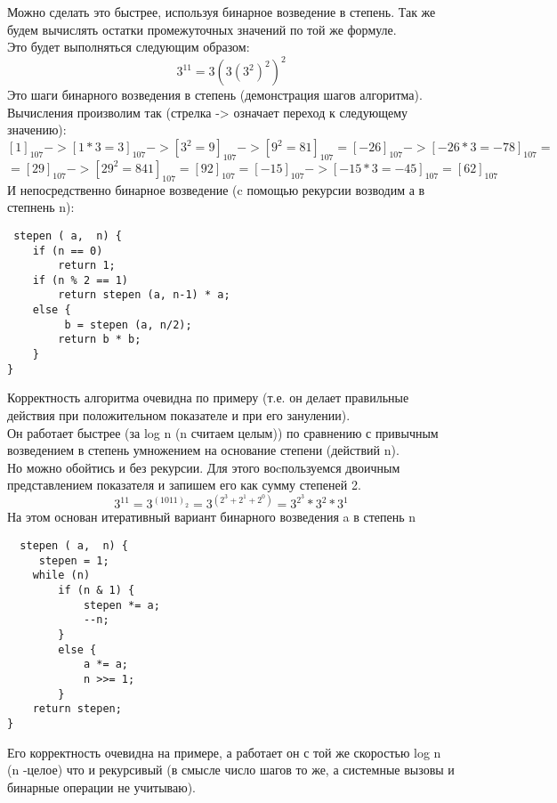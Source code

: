 \documentclass[a4paper,12pt]{article} %
\begin{document}
Можно сделать это быстрее, используя бинарное возведение в степень. Так же будем вычислять остатки  промежуточных значений по той же формуле.\\
Это будет выполняться следующим образом:\\
\[3^{11}=3\left(3\left(3^{2}\right)^{2}\right)^{2}\]
Это шаги бинарного возведения в степень (демонстрация шагов алгоритма).\\ Вычисления произволим так (стрелка -> означает переход к следующему значению):\\
\[[1]_{107} -> [1*3=3]_{107} -> [3^{2}=9]_{107} -> [9^{2}=81]_{107}=[-26]_{107} -> [-26*3=-78]_{107}=\]\[=[29]_{107} -> [29^{2}=841]_{107}=[92]_{107}=[-15]_{107} -> [-15*3=-45]_{107}=[62]_{107}\]
И непосредственно бинарное возведение (c помощью рекурсии возводим а в степнень n):\\
\begin{lstlisting}
 stepen ( a,  n) {
	if (n == 0)
		return 1;
	if (n % 2 == 1)
		return stepen (a, n-1) * a;
	else {
		 b = stepen (a, n/2);
		return b * b;
	}
}
\end{lstlisting}
Корректность алгоритма очевидна по примеру (т.е. он делает правильные действия при положительном показателе и при его занулении).\\
Он работает быстрее (за log n (n считаем целым)) по сравнению с привычным возведением в степень умножением на основание степени (действий n).\\
Но можно обойтись и без рекурсии. Для этого воcпользуемся двоичным представлением показателя и запишем его как сумму степеней 2.\\
\[3^{11}=3^{(1011)_{2}}=3^{(2^{3}+2^{1}+2^{0})}=3^{2^{3}}*3^{2}*3^{1}\]
На этом основан итеративный вариант бинарного возведения a в степень n\\

\begin{lstlisting}
  stepen ( a,  n) {
	 stepen = 1;
	while (n)
		if (n & 1) {
			stepen *= a;
			--n;
		}
		else {
			a *= a;
			n >>= 1;
		}
	return stepen;
}
\end{lstlisting}
Его корректность очевидна на примере, а работает он с той же скоростью log n (n -целое) что и рекурсивый (в смысле число шагов то же, а системные вызовы и бинарные операции не учитываю).
\end{document}
